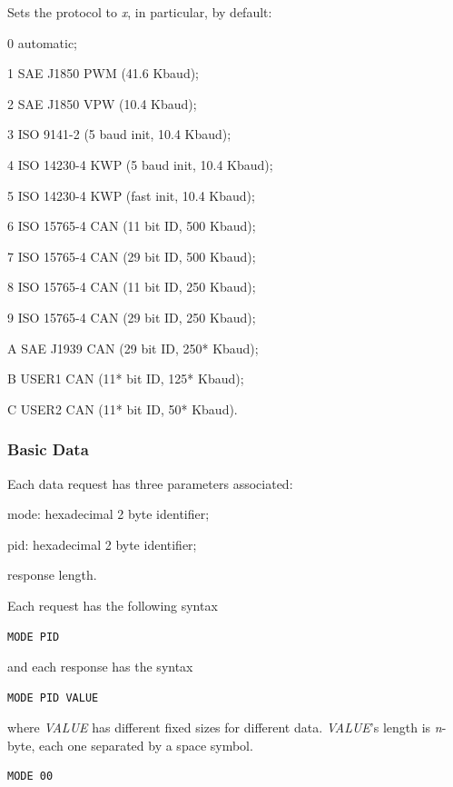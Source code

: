 \documentclass[twoside]{article}
\begin{document}
\begin{multicols}{2}
Sets the protocol to \emph{x}, in particular, by default:
\begin{compactitem}
  \item 0 automatic;
  \item 1 SAE J1850 PWM (41.6 Kbaud);
  \item 2 SAE J1850 VPW (10.4 Kbaud);
  \item 3 ISO 9141-2 (5 baud init, 10.4 Kbaud);
  \item 4 ISO 14230-4 KWP (5 baud init, 10.4 Kbaud);
  \item 5 ISO 14230-4 KWP (fast init, 10.4 Kbaud);
  \item 6 ISO 15765-4 CAN (11 bit ID, 500 Kbaud);
  \item 7 ISO 15765-4 CAN (29 bit ID, 500 Kbaud);
  \item 8 ISO 15765-4 CAN (11 bit ID, 250 Kbaud);
  \item 9 ISO 15765-4 CAN (29 bit ID, 250 Kbaud);
  \item A SAE J1939 CAN (29 bit ID, 250* Kbaud);
  \item B USER1 CAN (11* bit ID, 125* Kbaud);
  \item C USER2 CAN (11* bit ID, 50* Kbaud).
\end{compactitem}

\subsubsection{Basic Data}

Each data request has three parameters associated:
\begin{compactitem}
  \item mode: hexadecimal 2 byte identifier;
  \item pid: hexadecimal 2 byte identifier;
  \item response length.
\end{compactitem}

Each request has the following syntax
\begin{lstlisting}[language=bash]
MODE PID
\end{lstlisting}
and each response has the syntax
\begin{lstlisting}[language=bash]
MODE PID VALUE
\end{lstlisting}
where \emph{VALUE} has different fixed sizes for different data.
\emph{VALUE}'s length is \emph{n}-byte, each one separated by a space symbol.

\begin{lstlisting}[language=bash]
MODE 00
\end{lstlisting}


\end{multicols}
\end{document}
